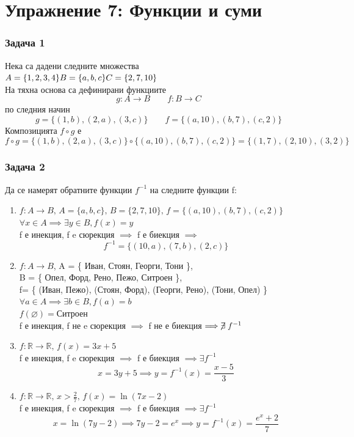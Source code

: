 \documentclass[fleqn, 12pt]{article}
\theoremstyle{definition}
\begin{document}
\newpage
\section{Упражнение 7: Функции и суми}

\subsubsection*{Задача 1}
Нека са дадени следните множества \\
$
A = \{1, 2, 3, 4\} \\
B = \{ a, b, c\} \\
C = \{2, 7, 10 \}
$\\
На тяхна основа са дефинирани функциите \\
$$g: A \to B \qquad f: B \to C$$
по следния начин
$$g = \{ (1, b), (2, a), (3, c) \} \qquad f = \{ (a, 10), (b, 7), (c, 2) \}$$
Композицията $f \circ g$ е \\
$$ f \circ g = \{ (1, b), (2, a), (3, c) \} \circ  \{ (a, 10), (b, 7), (c, 2) \} = \{ (1, 7), (2, 10), (3, 2) \}$$

\subsubsection*{Задача 2}
Да се намерят обратните функции $f^{-1}$ на следните функции f:
\begin{enumerate}
\item $f: A \to B, \, A = \{ a, b, c \}, \, B = \{2, 7, 10 \}, \, f = \{ (a, 10), (b, 7), (c, 2) \}$
$\forall x \in A \implies \exists y \in B, f(x) = y$\\
f е инекция, f e сюрекция $\implies$ f е биекция $\implies$
$$f^{-1} = \{ (10, a), (7, b), (2, c) \}$$
\item $f: A \to B$, A = \{ Иван, Стоян, Георги, Тони \}, \\
B = \{ Опел, Форд, Рено, Пежо, Ситроен \},\\ 
f= \{ (Иван, Пежо), (Стоян, Форд), (Георги, Рено), (Тони, Опел) \} \\
$\forall a \in A \implies \exists b \in B, f(a) = b$ \\
$f(\varnothing) = \text{Ситроен}$\\
f е инекция, f не e сюрекция $\implies $ f не е биекция$\implies \centernot\exists f^{-1}$ 
\item $f: \mathbb{R} \to \mathbb{R}, \, f(x) = 3x + 5$ \\
f е инекция, f e сюрекция $\implies$ f е биекция $\implies \exists f^{-1}$
$$x = 3y + 5 \implies y = f^{-1}(x) = \frac{x-5}{3} $$
\item $f: \mathbb{R} \to \mathbb{R}, \, x > \frac{2}{7}, \, f(x) = \ln{(7x-2)}$\\
f е инекция, f e сюрекция $\implies$ f е биекция $\implies \exists f^{-1}$
$$x = \ln{(7y-2)} \implies 7y - 2 = e^x \implies y = f^{-1}(x) = \frac{e^x + 2}{7}$$
\end{enumerate}
\end{document}
